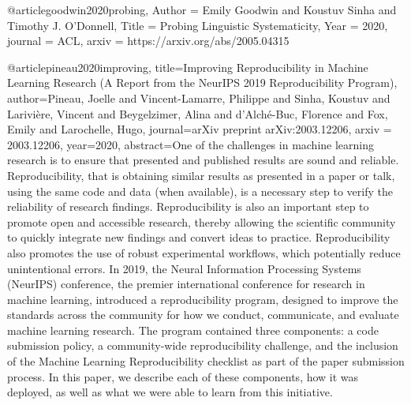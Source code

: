 @article{goodwin2020probing,
  Author = {Emily Goodwin and Koustuv Sinha and Timothy J. O'Donnell},
  Title = {Probing Linguistic Systematicity},
  Year = {2020},
  journal = {ACL},
  arxiv = {https://arxiv.org/abs/2005.04315}
}

@article{pineau2020improving,
  title={Improving Reproducibility in Machine Learning Research (A Report from the NeurIPS 2019 Reproducibility Program)},
  author={Pineau, Joelle and Vincent-Lamarre, Philippe and Sinha, Koustuv and Larivi{\`e}re, Vincent and Beygelzimer, Alina and d'Alch{\'e}-Buc, Florence and Fox, Emily and Larochelle, Hugo},
  journal={arXiv preprint arXiv:2003.12206},
  arxiv = {2003.12206},
  year={2020},
  abstract={One of the challenges in machine learning research is to ensure that presented and published results are sound and reliable. Reproducibility, that is obtaining similar results as presented in a paper or talk, using the same code and data (when available), is a necessary step to verify the reliability of research findings. Reproducibility is also an important step to promote open and accessible research, thereby allowing the scientific community to quickly integrate new findings and convert ideas to practice. Reproducibility also promotes the use of robust experimental workflows, which potentially reduce unintentional errors. In 2019, the Neural Information Processing Systems (NeurIPS) conference, the premier international conference for research in machine learning, introduced a reproducibility program, designed to improve the standards across the community for how we conduct, communicate, and evaluate machine learning research. The program contained three components: a code submission policy, a community-wide reproducibility challenge, and the inclusion of the Machine Learning Reproducibility checklist as part of the paper submission process. In this paper, we describe each of these components, how it was deployed, as well as what we were able to learn from this initiative.}
}

